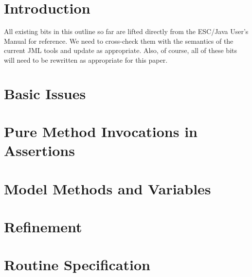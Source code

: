 \documentclass{acm_proc_article-sp}[10pt]
\begin{document}


\section{Introduction} %

All existing bits in this outline so far are lifted directly from the
ESC/Java User's Manual for reference.  We need to cross-check them
with the semantics of the current JML tools and update as appropriate.
Also, of course, all of these bits will need to be rewritten as
appropriate for this paper.

\section{Basic Issues}

\section{Pure Method Invocations in Assertions}

\section{Model Methods and Variables}

\section{Refinement}

\section{Routine Specification}
\end{document}
